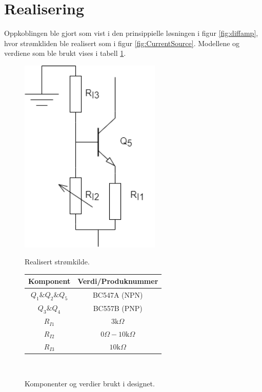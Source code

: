 \newpage
\section{Realisering}
\label{realiseringOgTest}

Oppkoblingen ble gjort som vist i den prinsippielle løsningen i figur \ref{fig:diffamp}, hvor strømkliden ble realisert som i figur \ref{fig:CurrentSource}. Modellene og verdiene som ble brukt vises i tabell \ref{tab:komnpomenter}. 

\begin{figure}[!h]
    \centering
    \begin{minipage}[c]{0.4\textwidth}
        \centering
        \includegraphics[width=0.6\textwidth]{Bilder/current_source.drawio.png} 
        \caption{Realisert strømkilde.}
        \label{fig:CurrentSource}
    \end{minipage}
    \hfill
    \begin{minipage}[c]{0.5\textwidth}
        \centering
        \begin{tabular}{ |c|c| }
            \hline
            Komponent & Verdi/Produknummer \\ \hline
            \hline
            $Q_1 \& Q_2 \&Q_5$ & BC547A (NPN) \\
            $Q_3 \& Q_4$ & BC557B (PNP) \\
            $R_{I1}$ & $3\text{k}\Omega $ \\
            $R_{I2}$ & $0\Omega - 10\text{k}\Omega$ \\
            $R_{I3}$ & $10\text{k}\Omega$ \\
            \hline
        \end{tabular}
        \\[60pt]
        \caption{Komponenter og verdier brukt i designet.}
        \label{tab:komnpomenter}
    \end{minipage}
\end{figure}

